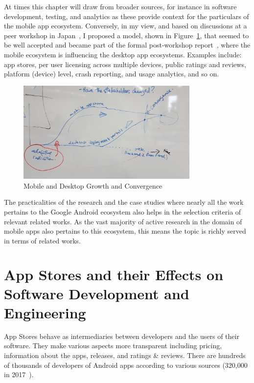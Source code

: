 At times this chapter will draw from broader sources, for instance in software development, testing, and analytics as these provide context for the particulars of the mobile app ecosystem. Conversely, in my view, and based on discussions at a peer workshop in Japan~\citep{nii_shonan_workshop_152}, I proposed a model, shown in Figure~\ref{fig:my_shonan_hysteresis_sketch}, that seemed to be well accepted and became part of the formal post-workshop report~\citep{nii_shonan_152_workshop_report}, where the mobile ecosystem is influencing the desktop app ecosystems. Examples include: app stores, per user licensing across multiple devices, public ratings and reviews, platform (device) level, crash reporting, and usage analytics, and so on.

\begin{figure}
    \centering
    \includegraphics[width=0.8\textwidth]{images/nii-shonan-workshop-152/shonan_hysteresis_diagram_20191210_132528.jpg}
    \caption{Mobile and Desktop Growth and Convergence}
    \label{fig:my_shonan_hysteresis_sketch}
\end{figure}

The practicalities of the research and the case studies where nearly all the work pertains to the Google Android ecosystem also helps in the selection criteria of relevant related works. As the vast majority of active research in the domain of mobile apps also pertains to this ecosystem, this means the topic is richly served in terms of related works.


\section{App Stores and their Effects on Software Development and Engineering}
App Stores behave as intermediaries between developers and the users of their software. They make various aspects more transparent including pricing, information about the apps, releases, and ratings \& reviews. There are hundreds of thousands of developers of Android apps according to various sources (320,000 in 2017~\cite{wang2017_exploratory_study_of_the_mobile_app_ecosystem}). 

